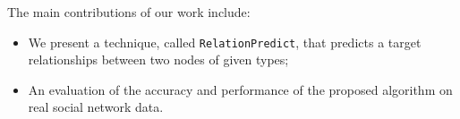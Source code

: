 


The main contributions of our work include:

\begin{itemize}

\item We present a technique, called \texttt{RelationPredict}, that predicts a target relationships between two nodes of given types;

\item An evaluation of the accuracy and performance of the proposed algorithm on real social network data.

\end{itemize}


\cite{Zhu2016} \cite{sun2011pathsim} \cite{Sun:2012:HRP:2124295.2124373}  \cite{huang2016meta} \cite{wang2016relsim} \cite{sun2013pathselclus} \cite{sun2011ASONAM} \cite{Yang2012} \cite{liben2007link}

